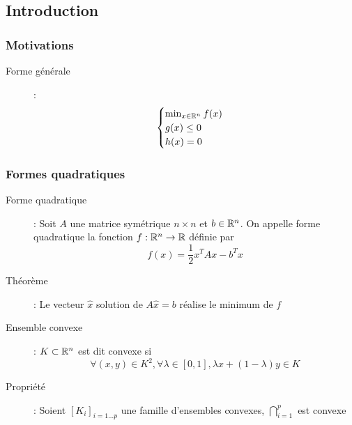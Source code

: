 \subsection{Introduction}
\subsubsection{Motivations}
\begin{description}
\item[Forme générale] :
    \[
        \begin{cases}
            \min_{x\in\mathbb{R}^n}f(x)\\
            g(x) \le 0\\
            h(x) = 0
        \end{cases}
    \]
\end{description}
\subsubsection{Formes quadratiques}
\begin{description}
\item[Forme quadratique] : Soit $A$ une matrice symétrique $n\times n$ et $b\in\mathbb{R}^n$. On appelle forme quadratique la fonction $f:\mathbb{R}^n\rightarrow\mathbb{R}$ définie par
    \[ f(x) = \frac{1}{2}x^TAx - b^Tx \]
\item[Théorème] : Le vecteur $\hat x$ solution de $A\hat x=b$ réalise le minimum de $f$
\item[Ensemble convexe] : $K\subset\mathbb{R}^n$ est dit convexe si
    \[
        \forall (x,y)\in K^2, \forall\lambda\in [0,1], \lambda x+(1-\lambda)y\in K
    \]
\item[Propriété] : Soient $[K_i]_ {i=1...p}$ une famille d'ensembles convexes, $\bigcap_{i=1}^p$ est convexe
\end{description}
